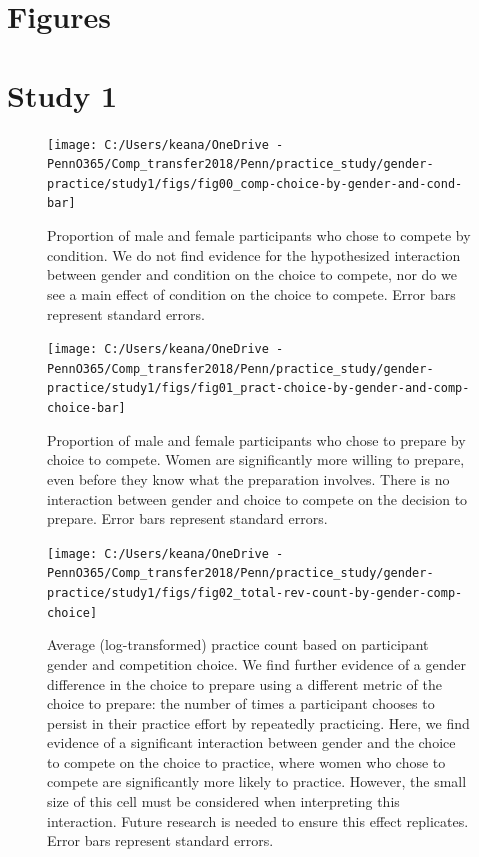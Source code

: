\documentclass[a4paper, nobind]{templates/ociamthesis}
\begin{document}
\hypertarget{figures}{%
\section{Figures}\label{figures}}

\hypertarget{study-1-1}{%
\section{Study 1}\label{study-1-1}}

\begin{figure}
\texttt{[image: C:/Users/keana/OneDrive - PennO365/Comp\_transfer2018/Penn/practice\_study/gender-practice/study1/figs/fig00\_comp-choice-by-gender-and-cond-bar]} \caption{Proportion of male and female participants who chose to compete by condition. We do not find evidence for the hypothesized interaction between gender and condition on the choice to compete, nor do we see a main effect of condition on the choice to compete. Error bars represent standard errors.}\label{fig:s100}
\end{figure}

\begin{figure}
\texttt{[image: C:/Users/keana/OneDrive - PennO365/Comp\_transfer2018/Penn/practice\_study/gender-practice/study1/figs/fig01\_pract-choice-by-gender-and-comp-choice-bar]} \caption{Proportion of male and female participants who chose to prepare by choice to compete. Women are significantly more willing to prepare, even before they know what the preparation involves. There is no interaction between gender and choice to compete on the decision to prepare. Error bars represent standard errors.}\label{fig:s101}
\end{figure}

\begin{figure}
\texttt{[image: C:/Users/keana/OneDrive - PennO365/Comp\_transfer2018/Penn/practice\_study/gender-practice/study1/figs/fig02\_total-rev-count-by-gender-comp-choice]} \caption{Average (log-transformed) practice count based on participant gender and competition choice. We find further evidence of a gender difference in the choice to prepare using a different metric of the choice to prepare: the number of times a participant chooses to persist in their practice effort by repeatedly practicing. Here, we find evidence of a significant interaction between gender and the choice to compete on the choice to practice, where women who chose to compete are significantly more likely to practice. However, the small size of this cell must be considered when interpreting this interaction. Future research is needed to ensure this effect replicates. Error bars represent standard errors.}\label{fig:s102}
\end{figure}
\end{document}

